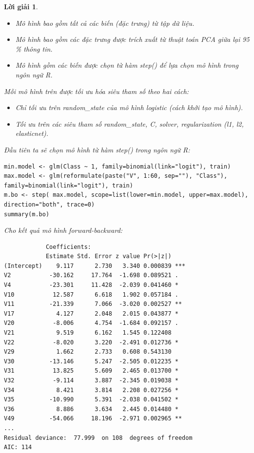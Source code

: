 \documentclass[14pt, a4paper]{article}
\theoremstyle{sltheorem}
\theoremstyle{soltheorem}
\newtheorem*{loigiai}{Lời giải}
\begin{document}
\begin{loigiai}
\begin{itemize}
        \begin{itemize}
            \item Mô hình bao gồm tất cả các biến (đặc trưng) từ tập dữ liệu.
            \item Mô hình bao gồm các đặc trưng được trích xuất từ thuật toán PCA giữa lại 95 \% thông tin.
            \item Mô hình gồm các biến được chọn từ hàm step() để lựa chọn mô hình trong ngôn ngữ R.
        \end{itemize}

        Mỗi mô hình trên được tối ưu hóa siêu tham số theo hai cách:

        \begin{itemize}
            \item Chỉ tối ưu trên random\_state của mô hình logistic (cách khởi tạo mô hình).
            \item Tối ưu trên các siêu tham số random\_state, C, solver, regularization (l1, l2, elasticnet).
        \end{itemize}

        Đầu tiên ta sẽ chọn mô hình từ hàm step() trong ngôn ngữ R:

        \begin{verbatim}
min.model <- glm(Class ~ 1, family=binomial(link="logit"), train)
max.model <- glm(reformulate(paste("V", 1:60, sep=""), "Class"), family=binomial(link="logit"), train)
m.bo <- step( max.model, scope=list(lower=min.model, upper=max.model), direction="both", trace=0)
summary(m.bo)
        \end{verbatim}

        Cho kết quả mô hình forward-backward:

        \begin{verbatim}
            Coefficients:
            Estimate Std. Error z value Pr(>|z|)    
(Intercept)    9.117      2.730   3.340 0.000839 ***
V2           -30.162     17.764  -1.698 0.089521 .  
V4           -23.301     11.428  -2.039 0.041460 *  
V10           12.587      6.618   1.902 0.057184 .  
V11          -21.339      7.066  -3.020 0.002527 ** 
V17            4.127      2.048   2.015 0.043877 *  
V20           -8.006      4.754  -1.684 0.092157 .  
V21            9.519      6.162   1.545 0.122408    
V22           -8.020      3.220  -2.491 0.012736 *  
V29            1.662      2.733   0.608 0.543130    
V30          -13.146      5.247  -2.505 0.012235 *  
V31           13.825      5.609   2.465 0.013700 *  
V32           -9.114      3.887  -2.345 0.019038 *  
V34            8.421      3.814   2.208 0.027256 *  
V35          -10.990      5.391  -2.038 0.041502 *  
V36            8.886      3.634   2.445 0.014480 *  
V49          -54.066     18.196  -2.971 0.002965 ** 
...
Residual deviance:  77.999  on 108  degrees of freedom
AIC: 114
        \end{verbatim}


\end{itemize}
\end{loigiai}
\end{document}
